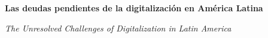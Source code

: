 
\renewcommand{\articuloidiomaxml}{es}
\renewcommand{\articulotitulo}{Las deudas pendientes de la digitalización en América Latina}
\renewcommand{\articuloautores}{Melisa Ferreyra}
\renewcommand{\articulodoi}{10.1080/10749039.2021.1908364}
\renewcommand{\articulotipo}{EDITORIAL}
\renewcommand{\articulorevista}{Actualidad Latinoamericana}
\renewcommand{\articuloissne}{2618-3137}
\renewcommand{\articulovolumen}{01}
\renewcommand{\articulonumero}{01}
\renewcommand{\articulofecha}{ 2026}
\renewcommand{\articulopagina}{1}

\setcounter{page}{1}
\thispagestyle{firstpage}

\noindent\begin{minipage}[t]{\dimexpr\textwidth+\marginparsep+\marginparwidth\relax}%
{\sffamily\bfseries\Large\articulotitulo\par}%
\end{minipage}\par
\vspace{3mm}%
\renewcommand{\articulotitulotrans}{The Unresolved Challenges of Digitalization in Latin America}
\noindent\begin{minipage}[t]{\dimexpr\textwidth+\marginparsep+\marginparwidth\relax}%
{\sffamily\itshape\normalsize\articulotitulotrans\par}%
\end{minipage}\par
\vspace{4mm}%

